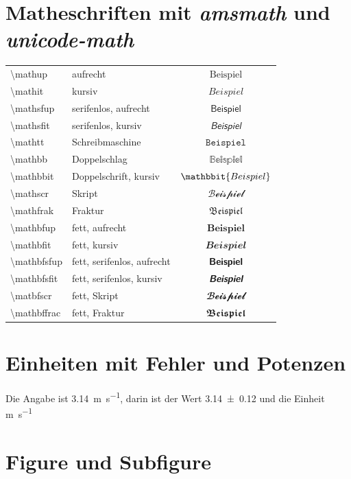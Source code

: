 \documentclass[parskip=half, titlepage=firstiscover, captions=tableheading,bibliography=totoc,]{scrartcl}
\begin{document}
\section{Matheschriften mit \emph{amsmath} und \emph{unicode-math}}
\begin{table}
\begin{tabular}{llc}
	\backslash mathup		& aufrecht					& $\mathup{Beispiel}$ \\
	\backslash mathit		& kursiv					& $\mathit{Beispiel}$ \\
	\backslash mathsfup		& serifenlos, aufrecht		& $\mathsfup{Beispiel}$ \\
	\backslash 	mathsfit	& serifenlos, kursiv		& $\mathsfit{Beispiel}$ \\
	\backslash 	mathtt		& Schreibmaschine			& $\mathtt{Beispiel}$ \\
	\backslash 	mathbb		& Doppelschlag				& $\mathbb{Beispiel}$ \\
	\backslash 	mathbbit	& Doppelschrift, kursiv		& $\mathbbit{Beispiel}$ \\
	\backslash 	mathscr		& Skript					& $\mathscr{Beispiel}$ \\
	\backslash 	mathfrak	& Fraktur					& $\mathfrak{Beispiel}$ \\
	\backslash mathbfup		& fett, aufrecht			& $\mathbfup{Beispiel}$ \\
	\backslash mathbfit		& fett, kursiv				& $\mathbfit{Beispiel}$ \\
	\backslash 	mathbfsfup	& fett, serifenlos, aufrecht& $\mathbfsfup{Beispiel}$ \\
	\backslash 	mathbfsfit	& fett, serifenlos, kursiv	& $\mathbfsfit{Beispiel}$ \\
	\backslash 	matbfscr	& fett, Skript				& $\mathbfscr{Beispiel}$ \\
	\backslash 	mathbffrac	& fett, Fraktur				& $\mathbffrak{Beispiel}$ 
\end{tabular}
\end{table}

\section{Einheiten mit Fehler und Potenzen}

Die Angabe ist \SI{3.14}{\meter\per\second},
darin ist 
der Wert \num{3.14 +- 0.12}%
und
die Einheit \si{\meter\per\second}


\section{Figure und Subfigure}
\end{document}
